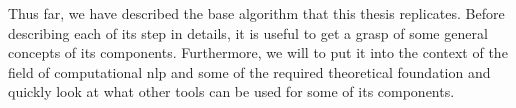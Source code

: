 
Thus far, we have described the base algorithm that this thesis replicates. Before describing each of its step in details, it is useful to get a grasp of some general concepts of its components. Furthermore, we will to put it into the context of the field of computational \gls{nlp} and some of the required theoretical foundation and quickly look at what other tools can be used for some of its components.



















